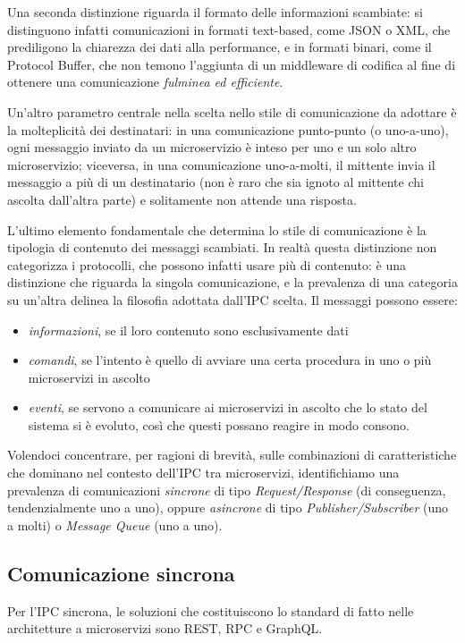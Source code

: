 Una seconda distinzione riguarda il formato delle informazioni scambiate: si distinguono infatti comunicazioni in formati text-based, come JSON o XML, che prediligono la chiarezza dei dati alla performance, e in formati binari, come il Protocol Buffer, che non temono l'aggiunta di un middleware di codifica al fine di ottenere una comunicazione \emph{fulminea ed efficiente}.

Un'altro parametro centrale nella scelta nello stile di comunicazione da adottare è la molteplicità dei destinatari: in una comunicazione punto-punto (o uno-a-uno), ogni messaggio inviato da un microservizio è inteso per uno e un solo altro microservizio; viceversa, in una comunicazione uno-a-molti, il mittente invia il messaggio a più di un destinatario (non è raro che sia ignoto al mittente chi ascolta dall'altra parte) e solitamente non attende una risposta.

L'ultimo elemento fondamentale che determina lo stile di comunicazione è la tipologia di contenuto dei messaggi scambiati. In realtà questa distinzione non categorizza i protocolli, che possono infatti usare più di contenuto: è una distinzione che riguarda la singola comunicazione, e la prevalenza di una categoria su un'altra delinea la filosofia adottata dall'IPC scelta.
Il messaggi possono essere:

\begin{itemize}
	\item \emph{informazioni}, se il loro contenuto sono esclusivamente dati
	\item \emph{comandi}, se l'intento è quello di avviare una certa procedura in uno o più microservizi in ascolto
	\item \emph{eventi}, se servono a comunicare ai microservizi in ascolto che lo stato del sistema si è evoluto, così che questi possano reagire in modo consono.
\end{itemize}


Volendoci concentrare, per ragioni di brevità, sulle combinazioni di caratteristiche che dominano nel contesto dell'IPC tra microservizi, identifichiamo una prevalenza di comunicazioni \emph{sincrone} di tipo \emph{Request/Response} (di conseguenza, tendenzialmente uno a uno), oppure \emph{asincrone} di tipo \emph{Publisher/Subscriber} (uno a molti) o \emph{Message Queue} (uno a uno).

\subsection{Comunicazione sincrona}
Per l'IPC sincrona, le soluzioni che costituiscono lo standard di fatto nelle architetture a microservizi sono REST, RPC e GraphQL.

